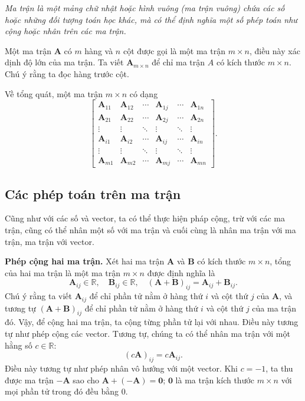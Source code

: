     \emph{Ma trận là một mảng chữ nhật hoặc hình vuông (ma trận vuông) chứa các số hoặc những đối tượng toán học khác, mà có thể định nghĩa một số phép toán như cộng hoặc nhân trên các ma trận.}
\vspace{8pt}

Một ma trận \(\mathbf{A}\) có \(m\) hàng và \(n\) cột được gọi là một ma trận \(m\times n\), điều này xác dịnh độ lớn của ma trận. Ta viết \(\mathbf{A}_{m\times n}\) để chỉ ma trận \(A\) có kích thước \(m\times n\). Chú ý rằng ta đọc hàng trước cột. 
\vspace{8pt}

Về tổng quát, một ma trận \(m\times n\) có dạng
\[\begin{bmatrix}
    \mathbf{A}_{11} &   \mathbf{A}_{12} &\cdots &\mathbf{A}_{1j} &\cdots      & \mathbf{A}_{1n}\\  
    \mathbf{A}_{21} &   \mathbf{A}_{22} &\cdots &\mathbf{A}_{2j} &\cdots      & \mathbf{A}_{2n}\\
    \vdots          &   \vdots          &\ddots &\vdots          &\ddots      & \vdots         \\
    \mathbf{A}_{i1} &   \mathbf{A}_{i2} &\cdots &\mathbf{A}_{ij} &\cdots      & \mathbf{A}_{in}\\
    \vdots          &   \vdots          &\ddots &\vdots          &\ddots      &\vdots          \\
    \mathbf{A}_{m1} &   \mathbf{A}_{m2} &\cdots &\mathbf{A}_{mj} &\cdots      & \mathbf{A}_{mn}              
\end{bmatrix}.\]
\subsection{Các phép toán trên ma trận}
Cũng như với các số và vector, ta có thể thực hiện pháp cộng, trừ với các ma trận, cũng có thể nhân một số với ma trận và cuối cùng là nhân ma trận với ma trận, ma trận với vector. 
\vspace{8pt}

\textbf{Phép cộng hai ma trận.} Xét hai ma trận \(\mathbf{A}\) và \(\mathbf{B}\) có kích thước \(m\times n\), tổng của hai ma trận là một ma trận \(m\times n\) được định nghĩa là 
\begin{equation}
   \mathbf{A}_{ij}\in\mathbb{R},\quad \mathbf{B}_{ij}\in\mathbb{R},\quad 
    (\mathbf{A}+\mathbf{B})_{ij}=\mathbf{A}_{ij}+\mathbf{B}_{ij}.
\end{equation}
Chú ý rằng ta viết \(\mathbf{A}_{ij}\) để chỉ phần tử nằm ở hàng thứ \(i\) và cột thứ \(j\) của \(\mathbf{A}\), và tương tự \((\mathbf{A+B})_{ij}\) để chỉ phần tử nằm ở hàng thứ \(i\) và cột thứ \(j\) của ma trận đó. Vậy, để cộng hai ma trận, ta cộng từng phần tử lại với nhau. Điều này tương tự như phép cộng các vector.
Tương tự, chúng ta có thể nhân ma trận với một hằng số \(c\in\mathbb{R}\):
\begin{equation}
    (c\mathbf{A})_{ij}=c\mathbf{A}_{ij}.
\end{equation}
Điều này tương tự như phép nhân vô hướng với một vector. Khi \(c=-1\), ta thu được ma trận \(-\mathbf{A}\) sao cho \(\mathbf{A}+(-\mathbf{A})=\mathbf{0}\); \(\mathbf{0}\) là ma trận kích thước \(m\times n\) với mọi phần tử trong đó đều bằng \(0\).

